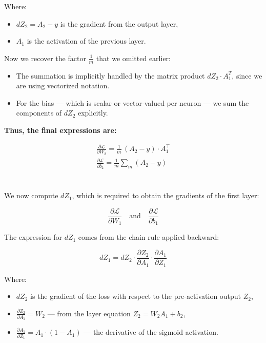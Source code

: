 \documentclass[11pt]{article}
\begin{document}
Where:
\begin{itemize}
  \item \( dZ_2 = A_2 - y \) is the gradient from the output layer,
  \item \( A_1 \) is the activation of the previous layer.
\end{itemize}

\vspace{1em}

Now we recover the factor \( \frac{1}{m} \) that we omitted earlier:

\vspace{0.5em}

\begin{itemize}
  \item The summation is implicitly handled by the matrix product \( dZ_2 \cdot A_1^T \), since we are using vectorized notation.
  \item For the bias — which is scalar or vector-valued per neuron — we sum the components of \( dZ_2 \) explicitly.
\end{itemize}

\vspace{1em}

\textbf{Thus, the final expressions are:}

\[
\begin{aligned}
\boxed{
\frac{\partial \mathcal{L}}{\partial W_2} = \frac{1}{m} \, (A_2 - y) \cdot A_1^\top
}
\\[1em]
\boxed{
\frac{\partial \mathcal{L}}{\partial b_2} = \frac{1}{m} \sum_m (A_2 - y)
}
\end{aligned}
\]
\section*{}

We now compute \( dZ_1 \), which is required to obtain the gradients of the first layer:

\[
\frac{\partial \mathcal{L}}{\partial W_1} \quad \text{and} \quad \frac{\partial \mathcal{L}}{\partial b_1}
\]

\vspace{1em}

The expression for \( dZ_1 \) comes from the chain rule applied backward:

\[
dZ_1 = dZ_2 \cdot \frac{\partial Z_2}{\partial A_1} \cdot \frac{\partial A_1}{\partial Z_1}
\]

Where:
\begin{itemize}
  \item \( dZ_2 \) is the gradient of the loss with respect to the pre-activation output \( Z_2 \),
  \item \( \frac{\partial Z_2}{\partial A_1} = W_2 \) — from the layer equation \( Z_2 = W_2 A_1 + b_2 \),
  \item \( \frac{\partial A_1}{\partial Z_1} = A_1 \cdot (1 - A_1) \) — the derivative of the sigmoid activation.
\end{itemize}
\end{document}
